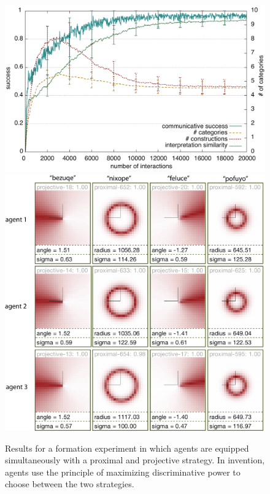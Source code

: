 \begin{figure}
	\begin{center}
		\includegraphics[width=0.8\columnwidth]{figs/category-formation-proximal+projective-results+categories-1}\\
		\includegraphics[width=0.8\columnwidth]{figs/category-formation-proximal+projective-results+categories-2.png}
	\end{center}
	\caption[Results simultaneous formation of proximal and projective systems]{Results for a formation experiment in which agents are equipped simultaneously
		with a proximal and projective strategy. In invention, agents use the principle of maximizing discriminative power
		to choose between the two strategies.}
	\label{f:category-formation-proximal+projective-results}
\end{figure}

